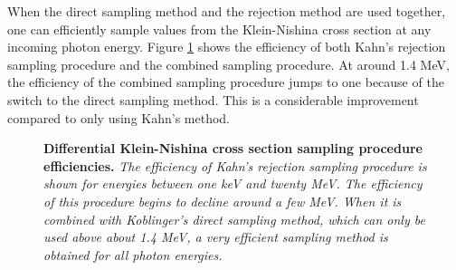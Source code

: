 When the direct sampling method and the rejection method are used together, one 
can efficiently sample values from the Klein-Nishina cross section at any 
incoming photon energy. Figure \ref{fig:diff_KN_sampling_proc_eff} shows the 
efficiency of both Kahn's rejection sampling procedure and the combined 
sampling procedure. At around 1.4 MeV, the efficiency of the combined sampling 
procedure jumps to one because of the switch to the direct sampling method. 
This is a considerable improvement compared to only using Kahn's method.
\begin{figure}[t!]
  \begin{center}
  \end{center}
  \caption{\textbf{Differential Klein-Nishina cross section sampling procedure efficiencies.}
    \textit{The efficiency of Kahn's rejection sampling procedure is shown for 
      energies between one keV and twenty MeV. The efficiency of this procedure
      begins to decline around a few MeV. When it is combined with Koblinger's
      direct sampling method, which can only be used above about 1.4 MeV, a
      very efficient sampling method is obtained for all photon energies.}}
  \label{fig:diff_KN_sampling_proc_eff}
\end{figure}

